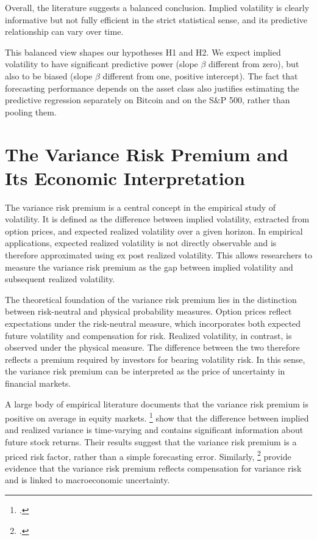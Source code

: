 \documentclass[11pt,a4paper,openany]{report}
\newcommand{\fcitet}[1]{\citet{#1}\footnote{\bibentry{#1}.}}
\begin{document}
Overall, the literature suggests a balanced conclusion. Implied
volatility is clearly informative but not fully efficient in the strict
statistical sense, and its predictive relationship can vary over time.

This balanced view shapes our hypotheses H1 and H2. We expect implied
volatility to have significant predictive power (slope $\beta$
different from zero), but also to be biased (slope $\beta$ different
from one, positive intercept). The fact that forecasting performance
depends on the asset class also justifies estimating the predictive
regression separately on Bitcoin and on the S\&P 500, rather than
pooling them.

\section{The Variance Risk Premium and Its Economic
Interpretation}\label{the-variance-risk-premium-and-its-economic-interpretation}

The variance risk premium is a central concept in the empirical study of
volatility. It is defined as the difference between implied volatility,
extracted from option prices, and expected realized volatility over a
given horizon. In empirical applications, expected realized volatility
is not directly observable and is therefore approximated using ex post
realized volatility. This allows researchers to measure the variance
risk premium as the gap between implied volatility and subsequent
realized volatility.

The theoretical foundation of the variance risk premium lies in the
distinction between risk-neutral and physical probability measures.
Option prices reflect expectations under the risk-neutral measure, which
incorporates both expected future volatility and compensation for risk.
Realized volatility, in contrast, is observed under the physical
measure. The difference between the two therefore reflects a premium
required by investors for bearing volatility risk. In this sense, the
variance risk premium can be interpreted as the price of uncertainty in
financial markets.

A large body of empirical literature documents that the variance risk
premium is positive on average in equity markets. \fcitet{bollerslev2009} show that the difference
between implied and realized variance is time-varying and contains
significant information about future stock returns. Their results
suggest that the variance risk premium is a priced risk factor, rather
than a simple forecasting error. Similarly, \fcitet{carr2009} provide
evidence that the variance risk premium reflects compensation for
variance risk and is linked to macroeconomic uncertainty.
\end{document}
